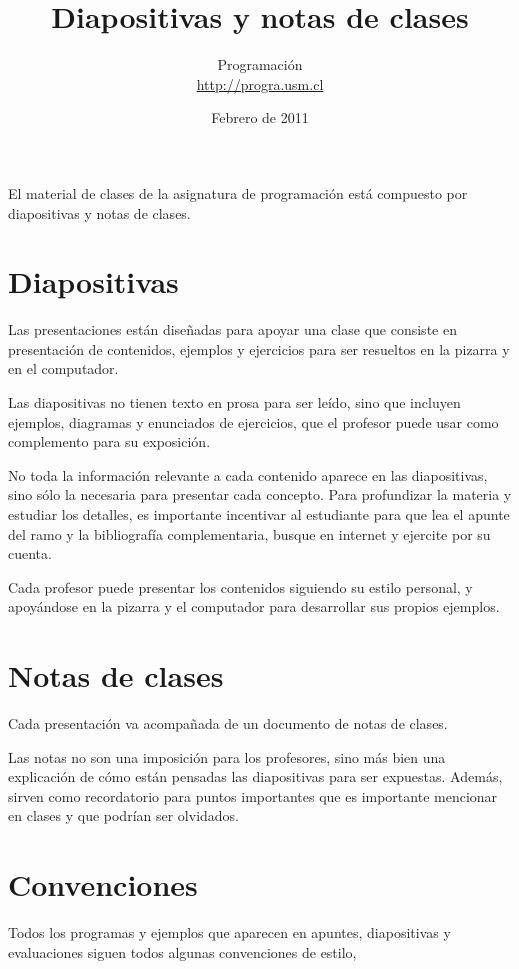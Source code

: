\documentclass[12pt]{article}
\title{Diapositivas y notas de clases}
\author{Programación \\ \url{http://progra.usm.cl}}
\date{Febrero de 2011}
\begin{document}
  \maketitle

  El material de clases de la asignatura de programación
  está compuesto por diapositivas y notas de clases.

  \section*{Diapositivas}

  Las presentaciones están diseñadas para apoyar una clase
  que consiste en presentación de contenidos,
  ejemplos y ejercicios para ser resueltos
  en la pizarra y en el computador.

  Las diapositivas no tienen texto en prosa para ser leído,
  sino que incluyen ejemplos, diagramas y enunciados de ejercicios,
  que el profesor puede usar como complemento para su exposición.

  No toda la información relevante a cada contenido
  aparece en las diapositivas,
  sino sólo la necesaria para presentar cada concepto.
  Para profundizar la materia y estudiar los detalles,
  es importante incentivar al estudiante
  para que lea el apunte del ramo y la bibliografía complementaria,
  busque en internet y ejercite por su cuenta.

  Cada profesor puede presentar los contenidos
  siguiendo su estilo personal,
  y apoyándose en la pizarra y el computador
  para desarrollar sus propios ejemplos.

  \section*{Notas de clases}
  Cada presentación va acompañada de un documento de notas de clases.

  Las notas no son una imposición para los profesores,
  sino más bien una explicación
  de cómo están pensadas las diapositivas para ser expuestas.
  Además, sirven como recordatorio para puntos importantes
  que es importante mencionar en clases
  y que podrían ser olvidados.

  \section*{Convenciones}

  Todos los programas y ejemplos que aparecen
  en apuntes, diapositivas y evaluaciones
  siguen todos algunas convenciones de estilo,
\end{document}

